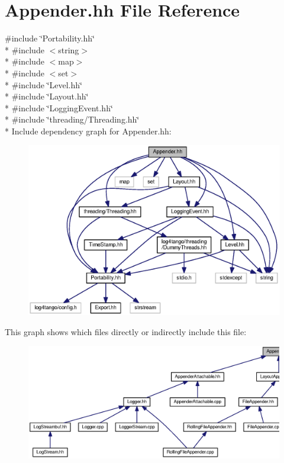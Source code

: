 \section{Appender.\-hh File Reference}
\label{Appender_8hh}
{\ttfamily \#include \char`\"{}Portability.\-hh\char`\"{}}\\*
{\ttfamily \#include $<$string$>$}\\*
{\ttfamily \#include $<$map$>$}\\*
{\ttfamily \#include $<$set$>$}\\*
{\ttfamily \#include \char`\"{}Level.\-hh\char`\"{}}\\*
{\ttfamily \#include \char`\"{}Layout.\-hh\char`\"{}}\\*
{\ttfamily \#include \char`\"{}Logging\-Event.\-hh\char`\"{}}\\*
{\ttfamily \#include \char`\"{}threading/\-Threading.\-hh\char`\"{}}\\*
Include dependency graph for Appender.\-hh\-:
\nopagebreak
\begin{figure}[H]
\begin{center}
\leavevmode
\includegraphics[width=350pt]{dd/d54/Appender_8hh__incl}
\end{center}
\end{figure}
This graph shows which files directly or indirectly include this file\-:
\nopagebreak
\begin{figure}[H]
\begin{center}
\leavevmode
\includegraphics[width=350pt]{df/d93/Appender_8hh__dep__incl}
\end{center}
\end{figure}
